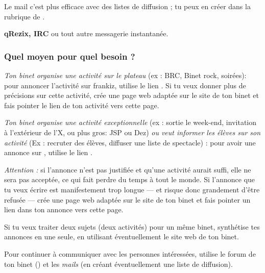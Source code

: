   Le mail c'est plus efficace avec des listes de diffusion ; tu peux en créer dans la rubrique  de .

\textbf{qRezix, IRC} ou tout autre messagerie instantanée.

\subsubsection{Quel moyen pour quel besoin ?}
\emph{Ton binet organise une activité sur le plateau} (ex : BRC,
Binet rock, soirées): pour annoncer l'activité sur frankiz, utilise
le lien . Si tu veux donner plus de
précisions sur cette activité, crée une page web adaptée sur le site
de ton binet et fais pointer le lien de ton activité vers cette
page.

\emph{Ton binet organise une activité exceptionnelle} (ex : sortie le week-end, invitation à l'extérieur de l'X, ou plus gros: JSP ou Dez) 
\emph{ou veut informer les élèves sur son activité} (Ex : recruter des élèves, diffuser une liste de spectacle) : pour avoir une annonce sur \fkz, utilise le lien .

\emph{Attention :} si l'annonce n'est pas justifiée et qu'une activité aurait suffi, elle ne sera pas acceptée, ce qui fait perdre du temps à tout le
monde. Si l'annonce que tu veux écrire est manifestement trop longue --- et risque donc grandement d'être refusée --- crée une page web adaptée sur le
site de ton binet et fais pointer un lien dans ton annonce vers cette page.

Si tu veux traiter deux sujets (deux activités) pour un même binet,
synthétise tes annonces en une seule, en utilisant éventuellement le
site web de ton binet.

Pour continuer à communiquer avec les personnes intéressées, utilise
le forum de ton binet () et les \emph{mails}
(en créant éventuellement une liste de diffusion).
